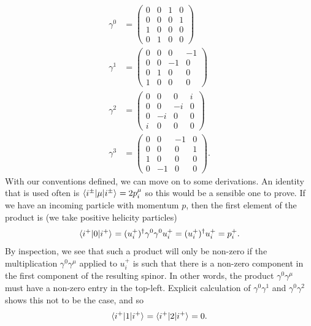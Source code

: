 \begin{subequations}
\begin{align}
\gamma^0 &= 
 \begin{pmatrix}
  0 & 0 & 1 & 0\\
  0 & 0 & 0 & 1\\
  1 & 0 & 0 & 0\\
  0 & 1 & 0 & 0
 \end{pmatrix}\\
 \gamma^1 &= 
 \begin{pmatrix}
  0 & 0 & 0 & -1\\
  0 & 0 & -1 & 0\\
  0 & 1 & 0 & 0\\
  1 & 0 & 0 & 0
 \end{pmatrix}\\
 \gamma^2 &= 
 \begin{pmatrix}
  0 & 0 & 0 & i\\
  0 & 0 & -i & 0\\
  0 & -i & 0 & 0\\
  i & 0 & 0 & 0
 \end{pmatrix}\\
 \gamma^3 &= 
 \begin{pmatrix}
  0 & 0 & -1 & 0\\
  0 & 0 & 0 & 1\\
  1 & 0 & 0 & 0\\
  0 & -1 & 0 & 0
 \end{pmatrix}.
 \end{align}
 \end{subequations}
With our conventions defined, we can move on to some derivations. An identity that is used often is $\mathinner{\langle i^\pm\vert\mu\vert i^\pm\rangle}_{} = 2p_i^\mu$ so this would be a sensible one to prove. If we have an incoming particle with momentum $p$, then the first element of the product is (we take positive helicity particles)
\begin{equation}
\mathinner{\langle i^+\vert0\vert i^+\rangle}_{} = (u_i^+)^\dagger \gamma^0 \gamma^0 u_i^+ =  (u_i^+)^\dagger u_i^+ = p_i^+.
\end{equation}
By inspection, we see that such a product will only be non-zero if the multiplication $\gamma^0 \gamma^\mu$ applied to $u_i^+$ is such that there is a non-zero component in the first component of the resulting spinor. In other words, the product $\gamma^0\gamma^\mu$ must have a non-zero entry in the top-left. Explicit calculation of $\gamma^0 \gamma^1$ and $\gamma^0 \gamma^2$ shows this not to be the case, and so
\begin{equation}
\mathinner{\langle i^+\vert1\vert i^+\rangle}_{} = \mathinner{\langle i^+\vert2\vert i^+\rangle}_{} = 0.
\end{equation}
